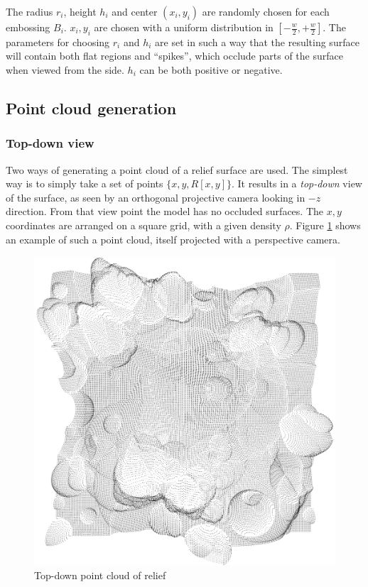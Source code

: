 The radius $r_i$, height $h_i$ and center $(x_i, y_i)$ are randomly chosen for each embossing $B_i$. $x_i, y_i$ are chosen with a uniform distribution in $[-\frac{w}{2}, +\frac{w}{2}]$. The parameters for choosing $r_i$ and $h_i$ are set in such a way that the resulting surface will contain both flat regions and ``spikes'', which occlude parts of the surface when viewed from the side. $h_i$ can be both positive or negative.

\subsection{Point cloud generation}
\subsubsection{Top-down view}
Two ways of generating a point cloud of a relief surface are used. The simplest way is to simply take a set of points $\{ x, y, R[x,y] \}$. It results in a \emph{top-down} view of the surface, as seen by an orthogonal projective camera looking in $-z$ direction. From that view point the model has no occluded surfaces. The $x, y$ coordinates are arranged on a square grid, with a given density $\rho$. Figure \ref{fig:relief_plain} shows an example of such a point cloud, itself projected with a perspective camera.

\begin{figure}[p]
\centering
\includegraphics[width=\textwidth]{fig/r1_plain.png}
\caption{Top-down point cloud of relief}
\label{fig:relief_plain}
\end{figure}

